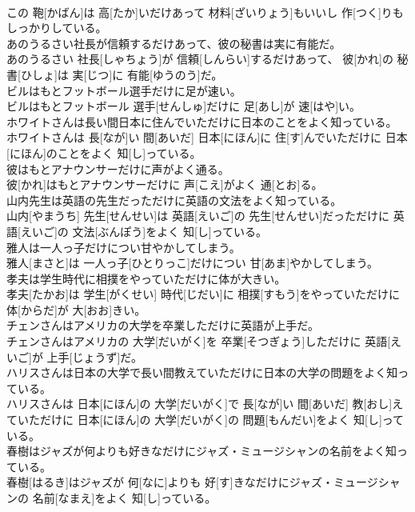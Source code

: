 \documentclass[8pt]{extreport}
\begin{document}
\begin{CJK}{UTF8}{min}
\\	この 鞄[かばん]は 高[たか]いだけあって 材料[ざいりょう]もいいし 作[つく]りもしっかりしている。
\\	あのうるさい社長が信頼するだけあって、彼の秘書は実に有能だ。	
\\	あのうるさい 社長[しゃちょう]が 信頼[しんらい]するだけあって、 彼[かれ]の 秘書[ひしょ]は 実[じつ]に 有能[ゆうのう]だ。
\\	ビルはもとフットボール選手だけに足が速い。	
\\	ビルはもとフットボール 選手[せんしゅ]だけに 足[あし]が 速[はや]い。
\\	ホワイトさんは長い間日本に住んでいただけに日本のことをよく知っている。	
\\	ホワイトさんは 長[なが]い 間[あいだ] 日本[にほん]に 住[す]んでいただけに 日本[にほん]のことをよく 知[し]っている。
\\	彼はもとアナウンサーだけに声がよく通る。	
\\	彼[かれ]はもとアナウンサーだけに 声[こえ]がよく 通[とお]る。
\\	山内先生は英語の先生だっただけに英語の文法をよく知っている。	
\\	山内[やまうち] 先生[せんせい]は 英語[えいご]の 先生[せんせい]だっただけに 英語[えいご]の 文法[ぶんぽう]をよく 知[し]っている。
\\	雅人は一人っ子だけについ甘やかしてしまう。	
\\	雅人[まさと]は 一人っ子[ひとりっこ]だけについ 甘[あま]やかしてしまう。
\\	孝夫は学生時代に相撲をやっていただけに体が大きい。	
\\	孝夫[たかお]は 学生[がくせい] 時代[じだい]に 相撲[すもう]をやっていただけに 体[からだ]が 大[おお]きい。
\\	チェンさんはアメリカの大学を卒業しただけに英語が上手だ。	
\\	チェンさんはアメリカの 大学[だいがく]を 卒業[そつぎょう]しただけに 英語[えいご]が 上手[じょうず]だ。
\\	ハリスさんは日本の大学で長い間教えていただけに日本の大学の問題をよく知っている。	
\\	ハリスさんは 日本[にほん]の 大学[だいがく]で 長[なが]い 間[あいだ] 教[おし]えていただけに 日本[にほん]の 大学[だいがく]の 問題[もんだい]をよく 知[し]っている。
\\	春樹はジャズが何よりも好きなだけにジャズ・ミュージシャンの名前をよく知っている。	
\\	春樹[はるき]はジャズが 何[なに]よりも 好[す]きなだけにジャズ・ミュージシャンの 名前[なまえ]をよく 知[し]っている。

\end{CJK}
\end{document}
